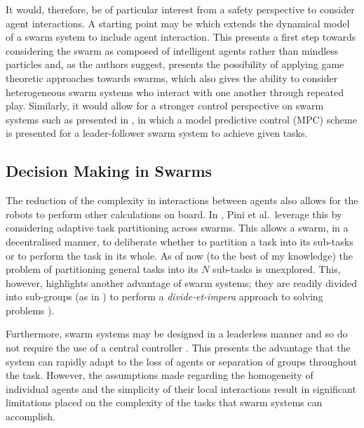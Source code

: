 \documentclass[.../main.tex]{subfiles}
\begin{document}
It would, therefore, be of particular interest from a safety perspective to consider agent
interactions. A starting point may be \cite{Bellomo2017} which extends the dynamical model of a
swarm system to include agent interaction. This presents a first step towards considering the swarm
as composed of intelligent agents rather than mindless particles and, as the authors suggest,
presents the possibility of applying game theoretic approaches towards swarms, which also gives the
ability to consider heterogeneous swarm systems who interact with one another through repeated play.
Similarly, it would allow for a stronger control perspective on swarm systems such as presented in
\cite{Borzi2015}, in which a model predictive control (MPC) scheme is presented for a
leader-follower swarm system to achieve given tasks. 


\subsection{Decision Making in Swarms} \label{sec::Decisions_in_Swarms}



The reduction of the complexity in interactions between agents also
allows for the robots to perform other calculations on board. In
\cite{Pini2011TaskSelection}, Pini et al.~leverage this by considering
adaptive task partitioning across swarms. This allows a swarm, in a
decentralised manner, to deliberate whether to partition a task into
its sub-tasks or to perform the task in its whole. As of now (to the
best of my knowledge) the problem of partitioning general tasks into
its $N$ sub-tasks is unexplored. This, however, highlights another
advantage of swarm systems; they are readily divided into sub-groups
(as in \cite{Zahadat2016DivisionInhibition}) to perform a
{\em divide-et-impera}
approach to solving problems
\cite{Pini2011TaskSelection}).

Furthermore, swarm systems may be designed in a leaderless manner and
so do not require the use of a central controller
\cite{Couceiro2015}. This presents the advantage that the system can
rapidly adapt to the loss of agents or separation of groups throughout
the task. However, the assumptions made regarding the homogeneity of
individual agents and the simplicity of their local interactions
result in significant limitations placed on the complexity of the
tasks that swarm systems can accomplish.
\end{document}
